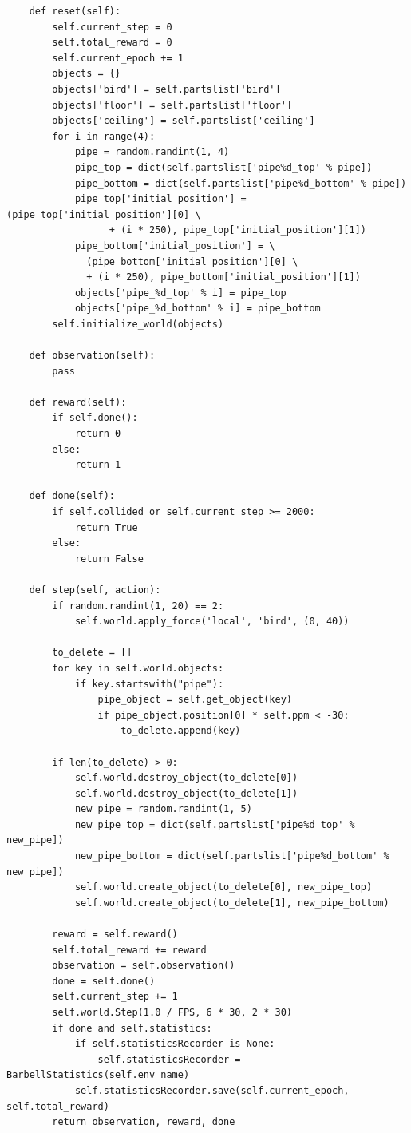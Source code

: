 \documentclass[cic,tc]{iiufrgs}
\newenvironment{longlisting}{\captionsetup{type=listing}}{}
\begin{document}
\begin{longlisting}
\begin{verbatim}
    def reset(self):
        self.current_step = 0
        self.total_reward = 0
        self.current_epoch += 1
        objects = {}
        objects['bird'] = self.partslist['bird']
        objects['floor'] = self.partslist['floor']
        objects['ceiling'] = self.partslist['ceiling']
        for i in range(4):
            pipe = random.randint(1, 4)
            pipe_top = dict(self.partslist['pipe%d_top' % pipe])
            pipe_bottom = dict(self.partslist['pipe%d_bottom' % pipe])
            pipe_top['initial_position'] = (pipe_top['initial_position'][0] \
                  + (i * 250), pipe_top['initial_position'][1])
            pipe_bottom['initial_position'] = \
              (pipe_bottom['initial_position'][0] \
              + (i * 250), pipe_bottom['initial_position'][1])
            objects['pipe_%d_top' % i] = pipe_top
            objects['pipe_%d_bottom' % i] = pipe_bottom
        self.initialize_world(objects)

    def observation(self):
        pass

    def reward(self):
        if self.done():
            return 0
        else:
            return 1

    def done(self):
        if self.collided or self.current_step >= 2000:
            return True
        else:
            return False

    def step(self, action):
        if random.randint(1, 20) == 2:
            self.world.apply_force('local', 'bird', (0, 40))

        to_delete = []
        for key in self.world.objects:
            if key.startswith("pipe"):
                pipe_object = self.get_object(key)
                if pipe_object.position[0] * self.ppm < -30:
                    to_delete.append(key)

        if len(to_delete) > 0:
            self.world.destroy_object(to_delete[0])
            self.world.destroy_object(to_delete[1])
            new_pipe = random.randint(1, 5)
            new_pipe_top = dict(self.partslist['pipe%d_top' % new_pipe])
            new_pipe_bottom = dict(self.partslist['pipe%d_bottom' % new_pipe])
            self.world.create_object(to_delete[0], new_pipe_top)
            self.world.create_object(to_delete[1], new_pipe_bottom)

        reward = self.reward()
        self.total_reward += reward
        observation = self.observation()
        done = self.done()
        self.current_step += 1
        self.world.Step(1.0 / FPS, 6 * 30, 2 * 30)
        if done and self.statistics:
            if self.statisticsRecorder is None:
                self.statisticsRecorder = BarbellStatistics(self.env_name)
            self.statisticsRecorder.save(self.current_epoch, self.total_reward)
        return observation, reward, done


\end{verbatim}
\end{longlisting}
\end{document}
